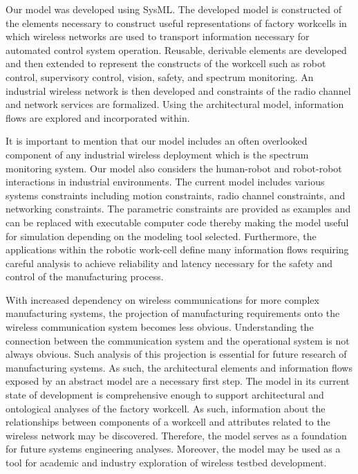 Our model was developed using SysML. The developed model is constructed of the elements necessary to construct useful representations of factory workcells in which wireless networks are used to transport information necessary for automated control system operation.  Reusable, derivable elements are developed and then extended to represent the constructs of the workcell such as robot control, supervisory control, vision, safety, and spectrum monitoring.  An industrial wireless network is then developed and constraints of the radio channel and network services are formalized. Using the architectural model, information flows are explored and incorporated within. 

It is important to mention that our model includes an often overlooked component of any industrial wireless deployment which is the spectrum monitoring system.  Our model also considers the human-robot and robot-robot interactions in industrial environments. The current model includes various systems constraints including motion constraints, radio channel constraints, and networking constraints. The parametric constraints are provided as examples and can be replaced with executable computer code thereby making the model useful for simulation depending on the modeling tool selected. Furthermore, the applications within the robotic work-cell define many information flows requiring careful analysis to achieve reliability and latency necessary for the safety and control of the manufacturing process.

With increased dependency on wireless communications for more complex manufacturing systems, the projection of manufacturing requirements onto the wireless communication system becomes less obvious.  Understanding the connection between the communication system and the operational system is not always obvious. Such analysis of this projection is essential for future research of manufacturing systems. As such, the architectural elements and information flows exposed by an abstract model are a necessary first step. The model in its current state of development is comprehensive enough to support architectural and ontological analyses of the factory workcell.  As such, information about the relationships between components of a workcell and attributes related to the wireless network may be discovered. Therefore, the model serves as a foundation for future systems engineering analyses. Moreover, the model may be used as a tool for academic and industry exploration of wireless testbed development.

